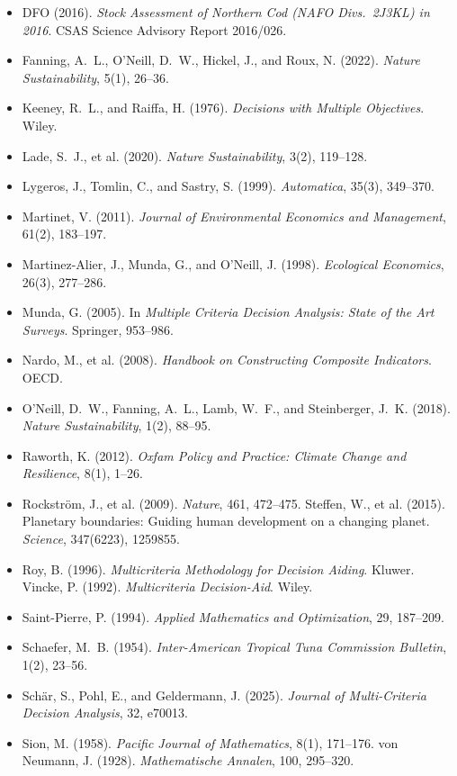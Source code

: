 \begin{itemize}[leftmargin=1.5em,itemsep=1pt]
\item DFO (2016). \emph{Stock Assessment of Northern Cod (NAFO Divs.\ 2J3KL) in 2016}. CSAS Science Advisory Report 2016/026.
\item Fanning, A.~L., O'Neill, D.~W., Hickel, J., and Roux, N. (2022). \emph{Nature Sustainability}, 5(1), 26--36.
\item Keeney, R.~L., and Raiffa, H. (1976). \emph{Decisions with Multiple Objectives}. Wiley.
\item Lade, S.~J., et al. (2020). \emph{Nature Sustainability}, 3(2), 119--128.
\item Lygeros, J., Tomlin, C., and Sastry, S. (1999). \emph{Automatica}, 35(3), 349--370.
\item Martinet, V. (2011). \emph{Journal of Environmental Economics and Management}, 61(2), 183--197.
\item Martinez-Alier, J., Munda, G., and O'Neill, J. (1998). \emph{Ecological Economics}, 26(3), 277--286.
\item Munda, G. (2005). In \emph{Multiple Criteria Decision Analysis: State of the Art Surveys}. Springer, 953--986.
\item Nardo, M., et al. (2008). \emph{Handbook on Constructing Composite Indicators}. OECD.
\item O'Neill, D.~W., Fanning, A.~L., Lamb, W.~F., and Steinberger, J.~K. (2018). \emph{Nature Sustainability}, 1(2), 88--95.
\item Raworth, K. (2012). \emph{Oxfam Policy and Practice: Climate Change and Resilience}, 8(1), 1--26.
\item Rockstr\"om, J., et al. (2009). \emph{Nature}, 461, 472--475. Steffen, W., et al. (2015). Planetary boundaries: Guiding human development on a changing planet. \emph{Science}, 347(6223), 1259855.
\item Roy, B. (1996). \emph{Multicriteria Methodology for Decision Aiding}. Kluwer. Vincke, P. (1992). \emph{Multicriteria Decision-Aid}. Wiley.
\item Saint-Pierre, P. (1994). \emph{Applied Mathematics and Optimization}, 29, 187--209.
\item Schaefer, M.~B. (1954). \emph{Inter-American Tropical Tuna Commission Bulletin}, 1(2), 23--56.
\item Sch\"ar, S., Pohl, E., and Geldermann, J. (2025). \emph{Journal of Multi-Criteria Decision Analysis}, 32, e70013.
\item Sion, M. (1958). \emph{Pacific Journal of Mathematics}, 8(1), 171--176. von Neumann, J. (1928). \emph{Mathematische Annalen}, 100, 295--320.
\end{itemize}


